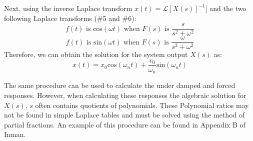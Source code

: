 \documentclass[12pt,letter]{article}
\numberwithin{ex}{section} %
\numberwithin{re}{section} %
\newcommand{\Laplace}[1]{\ensuremath{\mathcal{L}{\left[#1\right]}}}
\begin{document}
			Next, using the inverse Laplace transform $x(t) = \Laplace{X(s)}^{-1}]$ and the two following Laplace transforms (\#5 and \#6):
			\begin{equation}
			f(t) \text{ is cos}(\omega t) \text{ when }  F(s) \text{ is } \frac{s}{s^2+\omega^2} 
			\end{equation}
			\begin{equation}
			f(t) \text{ is sin}(\omega t)  \text{ when }  F(s) \text{ is } \frac{\omega}{s^2+\omega^2} 
			\end{equation}
			Therefore, we can obtain the solution for the system output $X(s)$ as:
			\begin{equation}
			x(t) = x_0 \text{cos}(\omega_n t) + \frac{v_0}{\omega_n}\text{sin}(\omega_n t)
			\end{equation}
			
			The same procedure can be used to calculate the under damped and forced responses. However, when calculating these responses the algebraic solution for $X(s)$, $s$ often contains quotients of polynomials. These Polynomial ratios may not be found in simple Laplace tables and must be solved using the method of partial fractions. An example of this procedure can be found in Appendix B of Inman. 
\end{document}
